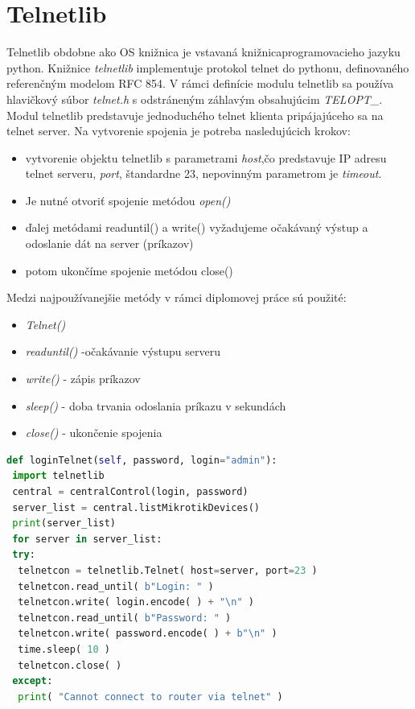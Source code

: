 \section{Telnetlib}
Telnetlib \cite{telnetlib} obdobne ako OS knižnica je vstavaná knižnicaprogramovacieho jazyku python. Knižnice \textit{telnetlib} implementuje protokol telnet do pythonu, definovaného referenčným modelom RFC 854. V rámci definície modulu telnetlib sa používa hlavičkový súbor \textit{telnet.h} s odstráneným záhlavým obsahujúcim \textit{TELOPT\_}. \\Modul telnetlib predstavuje jednoduchého telnet klienta pripájajúceho sa na telnet server. Na vytvorenie spojenia je potreba nasledujúcich krokov:
\begin{itemize}
\item vytvorenie objektu telnetlib s parametrami \textit{host},čo predstavuje IP adresu telnet serveru, \textit{port}, štandardne 23, nepovinným parametrom je \textit{timeout}. 
\item Je nutné otvoriť spojenie metódou \textit{open()}
\item ďalej metódami readuntil() a write() vyžadujeme očakávaný výstup a odoslanie dát na server (príkazov)
\item potom ukončíme spojenie metódou close()
\end{itemize}
Medzi najpoužívanejšie metódy v rámci diplomovej práce sú použité:
\begin{itemize}
\item  \textit{Telnet()}
\item \textit{readuntil()} -očakávanie výstupu serveru
\item \textit{write()} - zápis príkazov
\item \textit{sleep()} - doba trvania odoslania príkazu v sekundách
\item \textit{close()} - ukončenie spojenia
\end{itemize}
\begin{lstlisting}[language=python, frame=single, caption=Použitie knižnice telnetlib, captionpos=b, showstringspaces=false]
def loginTelnet(self, password, login="admin"):
 import telnetlib
 central = centralControl(login, password)
 server_list = central.listMikrotikDevices()
 print(server_list)
 for server in server_list:
 try:
  telnetcon = telnetlib.Telnet( host=server, port=23 )
  telnetcon.read_until( b"Login: " )
  telnetcon.write( login.encode( ) + "\n" )
  telnetcon.read_until( b"Password: " )
  telnetcon.write( password.encode( ) + b"\n" )
  time.sleep( 10 )
  telnetcon.close( )
 except:
  print( "Cannot connect to router via telnet" )
\end{lstlisting} 
